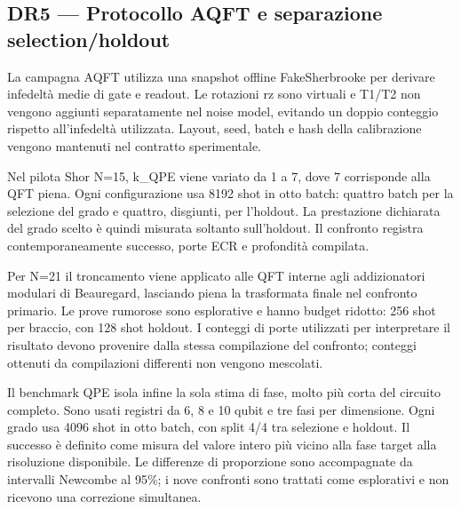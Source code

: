 \subsection{DR5 --- Protocollo AQFT e separazione selection/holdout}\label{sec:finale_3_5_6}

La campagna AQFT utilizza una snapshot offline FakeSherbrooke per derivare infedeltà medie di gate e readout. Le rotazioni rz sono virtuali e T1/T2 non vengono aggiunti separatamente nel noise model, evitando un doppio conteggio rispetto all'infedeltà utilizzata. Layout, seed, batch e hash della calibrazione vengono mantenuti nel contratto sperimentale.

Nel pilota Shor N=15, k\_QPE viene variato da 1 a 7, dove 7 corrisponde alla QFT piena. Ogni configurazione usa 8192 shot in otto batch: quattro batch per la selezione del grado e quattro, disgiunti, per l'holdout. La prestazione dichiarata del grado scelto è quindi misurata soltanto sull'holdout. Il confronto registra contemporaneamente successo, porte ECR e profondità compilata.

Per N=21 il troncamento viene applicato alle QFT interne agli addizionatori modulari di Beauregard, lasciando piena la trasformata finale nel confronto primario. Le prove rumorose sono esplorative e hanno budget ridotto: 256 shot per braccio, con 128 shot holdout. I conteggi di porte utilizzati per interpretare il risultato devono provenire dalla stessa compilazione del confronto; conteggi ottenuti da compilazioni differenti non vengono mescolati.

Il benchmark QPE isola infine la sola stima di fase, molto più corta del circuito completo. Sono usati registri da 6, 8 e 10 qubit e tre fasi per dimensione. Ogni grado usa 4096 shot in otto batch, con split 4/4 tra selezione e holdout. Il successo è definito come misura del valore intero più vicino alla fase target alla risoluzione disponibile. Le differenze di proporzione sono accompagnate da intervalli Newcombe al 95\%; i nove confronti sono trattati come esplorativi e non ricevono una correzione simultanea.

